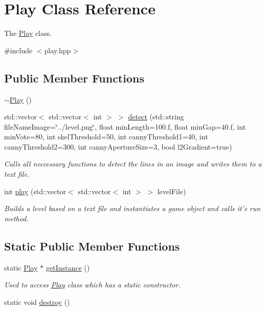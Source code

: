 \hypertarget{classPlay}{\section{Play Class Reference}
\label{classPlay}
}


The \hyperlink{classPlay}{Play} class.  




{\ttfamily \#include $<$play.\-hpp$>$}

\subsection*{Public Member Functions}
\begin{DoxyCompactItemize}
\item 
\hyperlink{classPlay_a6f7dd4d097454caef2e81fa94fe739d5}{$\sim$\-Play} ()
\item 
std\-::vector$<$ std\-::vector$<$ int $>$ $>$ \hyperlink{classPlay_a6c5115ce3ff13935a5792bbfd52fecd9}{detect} (std\-::string file\-Name\-Image=\char`\"{}../level.\-png\char`\"{}, float min\-Length=100.f, float min\-Gap=40.f, int min\-Vote=80, int skel\-Threshold=50, int canny\-Threshold1=40, int canny\-Threshold2=300, int canny\-Aperture\-Size=3, bool l2\-Gradient=true)
\begin{DoxyCompactList}\small\item\em Calls all neccessary functions to detect the lines in an image and writes them to a text file. \end{DoxyCompactList}\item 
int \hyperlink{classPlay_a3110107a17daf5459841feac52303768}{play} (std\-::vector$<$ std\-::vector$<$ int $>$ $>$ level\-File)
\begin{DoxyCompactList}\small\item\em Builds a level based on a text file and instantiates a game object and calls it's run method. \end{DoxyCompactList}\end{DoxyCompactItemize}
\subsection*{Static Public Member Functions}
\begin{DoxyCompactItemize}
\item 
static \hyperlink{classPlay}{Play} $\ast$ \hyperlink{classPlay_acb42061faea4c74846f0e1ab668a6c61}{get\-Instance} ()
\begin{DoxyCompactList}\small\item\em Used to access \hyperlink{classPlay}{Play} class which has a static constructor. \end{DoxyCompactList}\item 
static void \hyperlink{classPlay_a189f1935376f3dcd47d9d05b8ff29e65}{destroy} ()
\end{DoxyCompactItemize}



